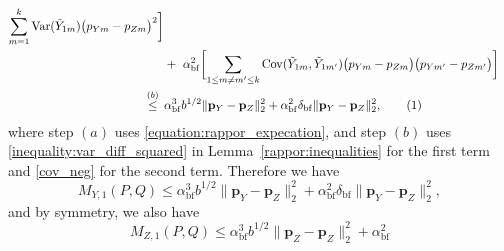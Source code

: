 \documentclass[twoside,11pt]{article}
\newcommand\numberthis{\addtocounter{equation}{1}\tag{\theequation}}
\newcommand{\rvTwo}{Y}
\newcommand{\rvThree}{Z}
\newcommand{\private}[1]{\tilde{#1}}
\newcommand{\normSqMultinomMax}{b}
\newcommand{\alphabetSize}{k} %
\newcommand{\vectorIndex}{m}
\newcommand{\probVecElement}[2]{p_{{#1}{#2}}}
\newcommand{\probVec}{\mathbf{p}} %
\newcommand{\kernelMoment}{M} %
\newcommand{\dataGenDist}{P}  %
\newcommand{\privacyMechanism}{Q}
\newcommand{\privacyParameter}{\alpha} %
\newcommand{\privacyParameterrappor}{\privacyParameter_{\mathrm{bf}}}
\newcommand{\smallNumber}{\delta}
\newcommand{\smallNumberrappor}{\smallNumber_{\mathrm{bf}}}
\newcommand{\momentTwosampleVarCondexpY}{\kernelMoment_{\rvTwo,1}(\dataGenDist, \privacyMechanism)}
\newcommand{\momentTwosampleVarCondexpZ}{\kernelMoment_{\rvThree,1}(\dataGenDist, \privacyMechanism)}
\begin{document}
\begin{appendix}
\begin{itemize}
\begin{align*}
		\sum_{\vectorIndex=1}^\alphabetSize
		\mathrm{Var}
		( %
		\private{\rvTwo}_{1 \vectorIndex}
		) %
		\bigl( %
		\probVecElement{\rvTwo}{\vectorIndex}
		- %
		\probVecElement{\rvThree}{\vectorIndex}
		\bigr)^2 %
		\biggr] %
		\\ &+~
		\privacyParameterrappor^2
		\biggl[ %
		\sum_{1 \leq \vectorIndex \neq \vectorIndex' \leq \alphabetSize}
		\mathrm{Cov}
		(
		\private{\rvTwo}_{1 \vectorIndex},
		\private{\rvTwo}_{1 \vectorIndex'}
		) %
		\bigl( %
		\probVecElement{\rvTwo}{\vectorIndex}
		- %
		\probVecElement{\rvThree}{\vectorIndex}
		\bigr) %
		\bigl( %
		\probVecElement{\rvTwo}{\vectorIndex'}
		- %
		\probVecElement{\rvThree}{\vectorIndex'}
		\bigr) %
		\biggr] %
		\\
		\stackrel{(b)}{\leq} \hskip 1.57mm &
		\privacyParameterrappor^3
		\normSqMultinomMax^{1/2}
		\|\probVec_{\rvTwo} - \probVec_{\rvThree}\|_2^2
		+
		\privacyParameterrappor^2
		\smallNumberrappor
		\|\probVec_{\rvTwo} - \probVec_{\rvThree}\|_2^2,
		\numberthis
		\label{term:multinomial:upperbound:rappor_elltwo:var_of_cond_expec}
	\end{align*}
	where step 
	$(a)$ uses \eqref{equation:rappor_expecation}, and step $(b)$ uses \eqref{inequality:var_diff_squared} in Lemma~\ref{rappor:inequalities} for the first term and \eqref{cov_neg} for the second term.
	Therefore we have
	\begin{equation}\label{inequality:rappor_elltwo_var_condexp_y}
		\momentTwosampleVarCondexpY
		\leq
		\privacyParameterrappor^3
		\normSqMultinomMax^{1/2}
		\|\probVec_{\rvTwo} - \probVec_{\rvThree}\|_2^2
		+
		\privacyParameterrappor^2
		\smallNumberrappor
		\|\probVec_{\rvTwo} - \probVec_{\rvThree}\|_2^2,
	\end{equation}
	and by symmetry, we also have
	\begin{equation}\label{inequality:rappor_elltwo_var_condexp_z}
		\momentTwosampleVarCondexpZ
		\leq
		\privacyParameterrappor^3
		\normSqMultinomMax^{1/2}
		\|\probVec_{\rvThree} - \probVec_{\rvThree}\|_2^2
		+
		\privacyParameterrappor^2

\end{equation}
\end{itemize}
\end{appendix}
\end{document}
